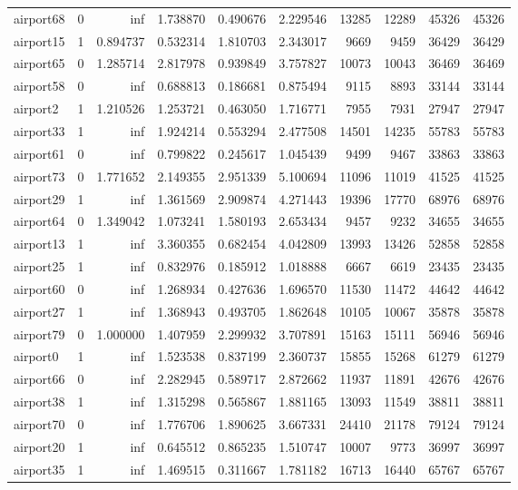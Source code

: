 \begin{longtable}{|l|r|r|r|r|r|r|r|r|r|}
airport68 & 0 & inf & 1.738870 & 0.490676 & 2.229546 & 13285 & 12289 & 45326 & 45326 \\
airport15 & 1 & 0.894737 & 0.532314 & 1.810703 & 2.343017 & 9669 & 9459 & 36429 & 36429 \\
airport65 & 0 & 1.285714 & 2.817978 & 0.939849 & 3.757827 & 10073 & 10043 & 36469 & 36469 \\
airport58 & 0 & inf & 0.688813 & 0.186681 & 0.875494 & 9115 & 8893 & 33144 & 33144 \\
airport2 & 1 & 1.210526 & 1.253721 & 0.463050 & 1.716771 & 7955 & 7931 & 27947 & 27947 \\
airport33 & 1 & inf & 1.924214 & 0.553294 & 2.477508 & 14501 & 14235 & 55783 & 55783 \\
airport61 & 0 & inf & 0.799822 & 0.245617 & 1.045439 & 9499 & 9467 & 33863 & 33863 \\
airport73 & 0 & 1.771652 & 2.149355 & 2.951339 & 5.100694 & 11096 & 11019 & 41525 & 41525 \\
airport29 & 1 & inf & 1.361569 & 2.909874 & 4.271443 & 19396 & 17770 & 68976 & 68976 \\
airport64 & 0 & 1.349042 & 1.073241 & 1.580193 & 2.653434 & 9457 & 9232 & 34655 & 34655 \\
airport13 & 1 & inf & 3.360355 & 0.682454 & 4.042809 & 13993 & 13426 & 52858 & 52858 \\
airport25 & 1 & inf & 0.832976 & 0.185912 & 1.018888 & 6667 & 6619 & 23435 & 23435 \\
airport60 & 0 & inf & 1.268934 & 0.427636 & 1.696570 & 11530 & 11472 & 44642 & 44642 \\
airport27 & 1 & inf & 1.368943 & 0.493705 & 1.862648 & 10105 & 10067 & 35878 & 35878 \\
airport79 & 0 & 1.000000 & 1.407959 & 2.299932 & 3.707891 & 15163 & 15111 & 56946 & 56946 \\
airport0 & 1 & inf & 1.523538 & 0.837199 & 2.360737 & 15855 & 15268 & 61279 & 61279 \\
airport66 & 0 & inf & 2.282945 & 0.589717 & 2.872662 & 11937 & 11891 & 42676 & 42676 \\
airport38 & 1 & inf & 1.315298 & 0.565867 & 1.881165 & 13093 & 11549 & 38811 & 38811 \\
airport70 & 0 & inf & 1.776706 & 1.890625 & 3.667331 & 24410 & 21178 & 79124 & 79124 \\
airport20 & 1 & inf & 0.645512 & 0.865235 & 1.510747 & 10007 & 9773 & 36997 & 36997 \\
airport35 & 1 & inf & 1.469515 & 0.311667 & 1.781182 & 16713 & 16440 & 65767 & 65767 \\

\end{longtable}
